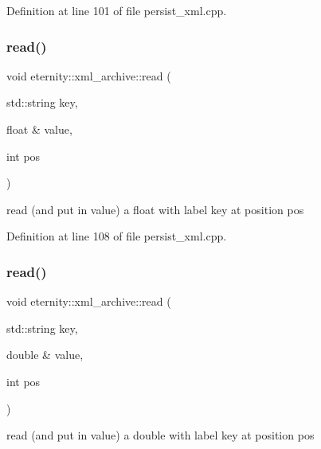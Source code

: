 Definition at line 101 of file persist\+\_\+xml.\+cpp.

\mbox{\label{classeternity_1_1xml__archive_a7b72b8361778f9a98bed64e9d23a760d}} 
\subsubsection{\texorpdfstring{read()}{read()}\hspace{0.1cm}{\footnotesize\ttfamily [5/6]}}
{\footnotesize\ttfamily void eternity\+::xml\+\_\+archive\+::read (\begin{DoxyParamCaption}\item[{std\+::string}]{key,  }\item[{float \&}]{value,  }\item[{int}]{pos }\end{DoxyParamCaption})}



read (and put in value) a float with label key at position pos 



Definition at line 108 of file persist\+\_\+xml.\+cpp.

\mbox{\label{classeternity_1_1xml__archive_a83705b3ef651a402e886d73f288800ef}} 
\subsubsection{\texorpdfstring{read()}{read()}\hspace{0.1cm}{\footnotesize\ttfamily [6/6]}}
{\footnotesize\ttfamily void eternity\+::xml\+\_\+archive\+::read (\begin{DoxyParamCaption}\item[{std\+::string}]{key,  }\item[{double \&}]{value,  }\item[{int}]{pos }\end{DoxyParamCaption})}



read (and put in value) a double with label key at position pos 



